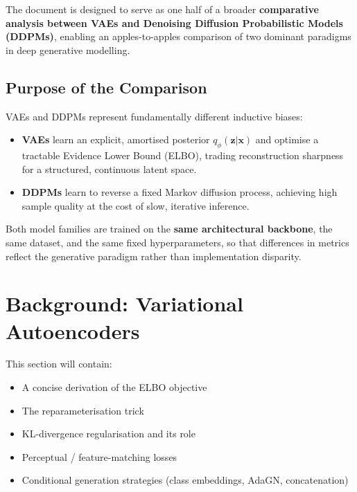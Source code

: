 \documentclass[12pt, a4paper]{article}
\begin{document}
The document is designed to serve as one half of a broader
\textbf{comparative analysis between VAEs and Denoising Diffusion
Probabilistic Models (DDPMs)}, enabling an apples-to-apples comparison
of two dominant paradigms in deep generative modelling.

\subsection{Purpose of the Comparison}

VAEs and DDPMs represent fundamentally different inductive biases:

\begin{itemize}
    \item \textbf{VAEs} learn an explicit, amortised posterior
          $q_\phi(\mathbf{z} | \mathbf{x})$ and optimise a tractable
          Evidence Lower Bound (ELBO), trading reconstruction sharpness
          for a structured, continuous latent space.

    \item \textbf{DDPMs} learn to reverse a fixed Markov diffusion
          process, achieving high sample quality at the cost of slow,
          iterative inference.
\end{itemize}

Both model families are trained on the \textbf{same architectural
backbone}, the same dataset, and the same fixed hyperparameters, so
that differences in metrics reflect the generative paradigm rather
than implementation disparity.

\section{Background: Variational Autoencoders}
\label{sec:background}

\begin{tcolorbox}[colback=yellow!8, colframe=orange!60!black,
                  fonttitle=\bfseries, title={Content placeholder}]
This section will contain:
\begin{itemize}
    \item A concise derivation of the ELBO objective
    \item The reparameterisation trick
    \item KL-divergence regularisation and its role
    \item Perceptual / feature-matching losses
    \item Conditional generation strategies (class embeddings,
          AdaGN, concatenation)
\end{itemize}
\end{tcolorbox}
\end{document}
